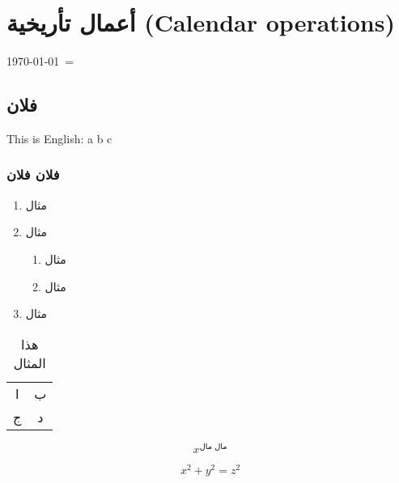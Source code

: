 \documentclass[a4paper]{book}%
\begin{document}
\section{أعمال تأريخية \textenglish{(Calendar operations)}}

\setfootnoteLR
\today\ = \Hijritoday%
\setfootnoteRL

\subsection{فلان}
\textenglish{This is English: a b c} %

\subsubsection{فلان فلان}
\begin{enumerate}
	\item مثال
	\item مثال
		\begin{enumerate}
			\item مثال
			\item مثال
		\end{enumerate}

	\item مثال	
\end{enumerate}

\begin{table}[h]
	\centering
	\begin{tabular}{cc}
		ا & ب  \\
		ج & د  
	\end{tabular}
	\caption{هذا المثال}
\end{table}

\[
x^\text{مال مال}
\]

\begin{equation}
	x^2 + y^2 = z^2
	\label{test}
\end{equation}
\end{document}
